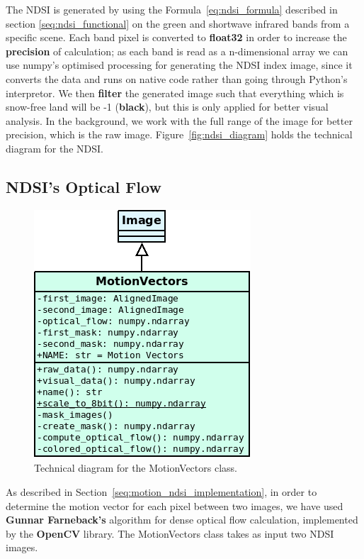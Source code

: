 \documentclass[11pt, a4paper]{report}
\begin{document}
	The NDSI is generated by using the Formula~\ref{eq:ndsi_formula} described in section \ref{seq:ndsi_functional} on the green and shortwave infrared bands from a specific scene. Each band pixel is converted to \textbf{float32} in order to increase the \textbf{precision} of calculation; as each band is read as a n-dimensional array we can use numpy's optimised processing for generating the NDSI index image, since it converts the data and runs on native code rather than going through Python's interpretor. We then \textbf{filter} the generated image such that everything which is snow-free land will be -1 (\textbf{black}), but this is only applied for better visual analysis. In the background, we work with the full range of the image for better precision, which is the raw image. Figure~\ref{fig:ndsi_diagram} holds the technical diagram for the NDSI.


	\subsection{NDSI's Optical Flow}
	\begin{figure}[h!]
		\centering
		\includegraphics[scale=0.6]{../images/motion_vectors_diagram.png}
		\caption{Technical diagram for the MotionVectors class.}
		\label{fig:motion_vectors_diagram}
	\end{figure}
	As described in Section~\ref{seq:motion_ndsi_implementation}, in order to determine the motion vector for each pixel between two images, we have used \textbf{Gunnar Farneback's} algorithm for dense optical flow calculation, implemented by the \textbf{OpenCV} library. The MotionVectors class takes as input two NDSI images.
	
\end{document}
